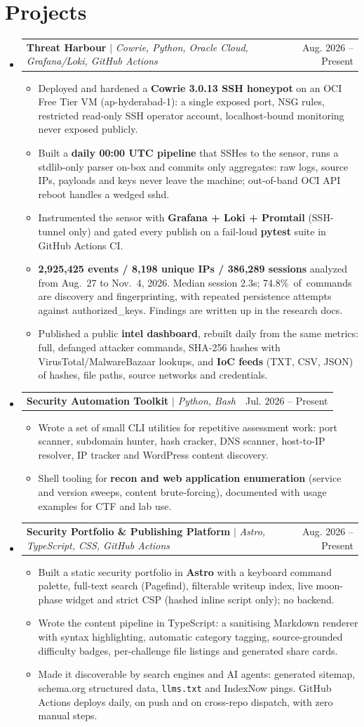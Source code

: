 \documentclass[letterpaper,11pt]{article}
\makeatletter
\newcommand{\resumeItem}[1]{
  \item\small{
    {#1\vspace{-2pt}}
  }
}
\newcommand{\resumeProjectHeading}[2]{
    \item
    \begin{tabular*}{\linewidth}{l@{\extracolsep{\fill}}r}
      \small#1 & #2 \\
    \end{tabular*}\vspace{-7pt}
}
\newcommand{\resumeSubHeadingListStart}{\begin{itemize}[leftmargin=0.15in, label={}]}
\newcommand{\resumeSubHeadingListEnd}{\end{itemize}}
\newcommand{\resumeItemListStart}{\begin{itemize}}
\newcommand{\resumeItemListEnd}{\end{itemize}\vspace{-5pt}}
\makeatother
\begin{document}
\section{Projects}
    \resumeSubHeadingListStart
      \resumeProjectHeading
          {\textbf{Threat Harbour} $|$ \emph{Cowrie, Python, Oracle Cloud, Grafana/Loki, GitHub Actions}}{Aug. 2026 -- Present}
          \resumeItemListStart
            \resumeItem{Deployed and hardened a \textbf{Cowrie 3.0.13 SSH honeypot} on an OCI Free Tier VM (ap-hyderabad-1): a single exposed port, NSG rules, restricted read-only SSH operator account, localhost-bound monitoring never exposed publicly.}
            \resumeItem{Built a \textbf{daily 00:00 UTC pipeline} that SSHes to the sensor, runs a stdlib-only parser on-box and commits only aggregates: raw logs, source IPs, payloads and keys never leave the machine; out-of-band OCI API reboot handles a wedged sshd.}
            \resumeItem{Instrumented the sensor with \textbf{Grafana + Loki + Promtail} (SSH-tunnel only) and gated every publish on a fail-loud \textbf{pytest} suite in GitHub Actions CI.}
            \resumeItem{\textbf{2,925,425 events / 8,198 unique IPs / 386,289 sessions} analyzed from Aug.~27 to Nov.~4, 2026. Median session 2.3s; 74.8\%~of~commands are discovery and fingerprinting, with repeated persistence attempts against authorized\_keys. Findings are written up in the research docs.}
            \resumeItem{Published a public \textbf{intel dashboard}, rebuilt daily from the same metrics: full, defanged attacker commands, SHA-256 hashes with VirusTotal/MalwareBazaar lookups, and \textbf{IoC feeds} (TXT, CSV, JSON) of hashes, file paths, source networks and credentials.}
          \resumeItemListEnd
      \resumeProjectHeading
          {\textbf{Security Automation Toolkit} $|$ \emph{Python, Bash}}{Jul. 2026 -- Present}
          \resumeItemListStart
            \resumeItem{Wrote a set of small CLI utilities for repetitive assessment work: port scanner, subdomain hunter, hash cracker, DNS scanner, host-to-IP resolver, IP tracker and WordPress content discovery.}
            \resumeItem{Shell tooling for \textbf{recon and web application enumeration} (service and version sweeps, content brute-forcing), documented with usage examples for CTF and lab use.}
          \resumeItemListEnd
      \resumeProjectHeading
          {\textbf{Security Portfolio \& Publishing Platform} $|$ \emph{Astro, TypeScript, CSS, GitHub Actions}}{Aug. 2026 -- Present}
          \resumeItemListStart
            \resumeItem{Built a static security portfolio in \textbf{Astro} with a keyboard command palette, full-text search (Pagefind), filterable writeup index, live moon-phase widget and strict CSP (hashed inline script only); no backend.}
            \resumeItem{Wrote the content pipeline in TypeScript: a sanitising Markdown renderer with syntax highlighting, automatic category tagging, source-grounded difficulty badges, per-challenge file listings and generated share cards.}
            \resumeItem{Made it discoverable by search engines and AI agents: generated sitemap, schema.org structured data, \texttt{llms.txt} and IndexNow pings. GitHub Actions deploys daily, on push and on cross-repo dispatch, with zero manual steps.}
          \resumeItemListEnd
    \resumeSubHeadingListEnd
\end{document}
